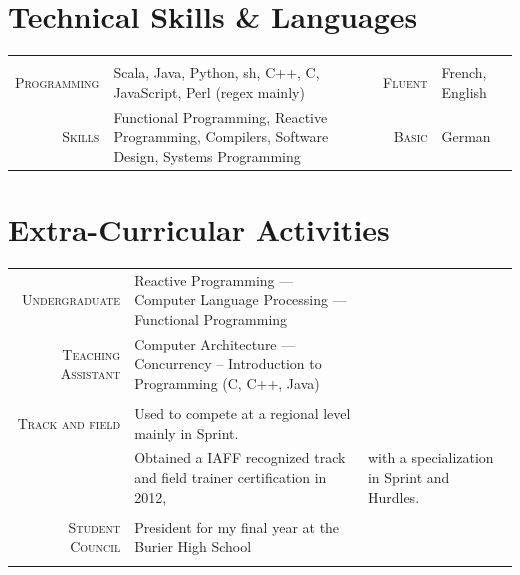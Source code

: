 \documentclass[a4paper,11pt]{article} %
\begin{document}
\section{Technical Skills \& Languages}
\begin{center}

\vspace{-0.3cm}
\begin{tabularx}{\textwidth}{rX|rl}

& & & \\
\textsc{\large{Programming}} & Scala, Java, Python, sh, C++, C, JavaScript, Perl (regex mainly) &
\textsc{\large{Fluent}} & French, English \\
\textsc{\large{Skills}} & Functional Programming, Reactive Programming, Compilers, Software Design, Systems Programming &
\textsc{\large{Basic}} & German \\

\end{tabularx}

\end{center}


\section{Extra-Curricular Activities}
\begin{tabular}{rl}
\textsc{\large{Undergraduate}} &
Reactive Programming ---
Computer Language Processing --- Functional Programming \\
\textsc{\large{Teaching Assistant}} &
Computer Architecture --- Concurrency -- Introduction to Programming (C, C++, Java) \\
 \\

\textsc{\large{Track and field}} &
Used to compete at a regional level mainly in Sprint.\\
& Obtained a IAFF recognized track and field trainer certification in 2012,
& with a specialization in Sprint and Hurdles.\\
 \\

\textsc{\large{Student Council}} &
President for my final year at the Burier High School \\
 \\

\end{tabular}
\end{document}
